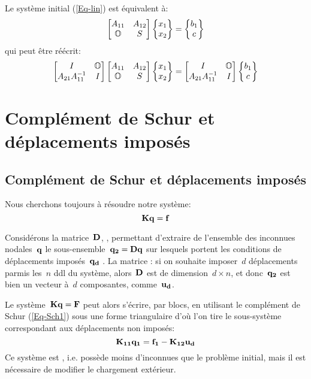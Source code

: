 \medskipvm
Le système initial (\ref{Eq-lin}) est équivalent à:
\begin{equation}\label{Eq-Sch1}
\MM*{A_{11} & A_{12}\\ \mO & S}
\VV*{x_1\\ x_2} =
\VV*{b_1\\ c}
\end{equation}
qui peut être réécrit:
\begin{equation}
\MM*{I & \mO{} \\ A_{21}A_{11}^{-1} & I}
\MM*{A_{11} & A_{12}\\ \mO{} & S}
\VV*{x_1\\ x_2} =
\MM*{I & \mO{} \\ A_{21}A_{11}^{-1} & I}
\VV*{b_1\\ c}
\end{equation}

\medskip
\ifVersionAvecExemplesSepares
  \section{Complément de Schur et déplacements imposés}
\else
  \subsection{Complément de Schur et déplacements imposés}
\fi
Nous cherchons toujours à résoudre notre système:
\begin{equation}\MM{K}\VV{q}=\VV{f}\end{equation}

\medskip
Considérons la matrice~$\MM{D}$, , permettant d'extraire de l'ensemble des inconnues
nodales~$\VV{q}$ le sous-ensemble~$\VV{q_2}=\MM{D}\VV{q}$ sur lesquels portent les conditions de déplacements imposés~$\VV{q_d}$
.
La matrice : si on souhaite imposer~$d$ déplacements parmis les~$n$ ddl
du système, alors~$\MM{D}$ est de dimension~$d\times n$, et donc~$\VV{q_2}$ est bien un vecteur à~$d$ composantes,
comme~$\VV{u_d}$.

\medskip
Le système~$\MM{K}\VV{q}=\VV{F}$ peut alors s'écrire, par blocs, en utilisant le complément de Schur (\ref{Eq-Sch1}) sous une
forme triangulaire d'où l'on tire le sous-système correspondant aux déplacements non imposés:
\begin{equation}
\MM{K_{11}}\VV{q_1} = \VV{f_1} - \MM{K_{12}}\VV{u_d}
\end{equation}
\medskipvm
Ce système est , i.e. possède moins d'inconnues que le problème initial, mais il est nécessaire de
modifier le chargement extérieur.

